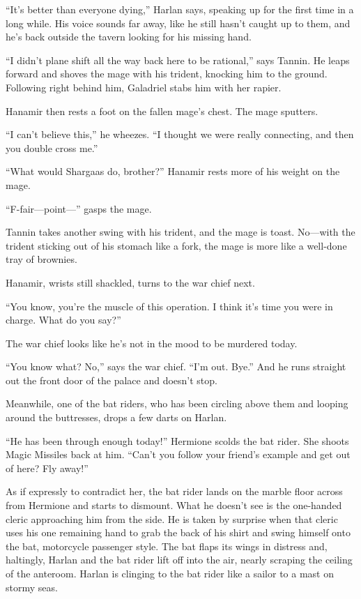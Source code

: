 \documentclass[smalldemyvopaper,11pt,twoside,onecolumn,openright,extrafontsizes]{memoir}
\newlength\drop
\begin{document}
``It's better than everyone dying,'' Harlan says, speaking up for the
first time in a long while. His voice sounds far away, like he still
hasn't caught up to them, and he's back outside the tavern looking for
his missing hand.

``I didn't plane shift all the way back here to be rational,'' says
Tannin. He leaps forward and shoves the mage with his trident, knocking
him to the ground. Following right behind him, Galadriel stabs him with
her rapier.

Hanamir then rests a foot on the fallen mage's chest. The mage sputters.

``I can't believe this,'' he wheezes. ``I thought we were really
connecting, and then you double cross me.''

``What would Shargaas do, brother?'' Hanamir rests more of his weight on
the mage.

``F-fair---point---'' gasps the mage.

Tannin takes another swing with his trident, and the mage is toast.
No---with the trident sticking out of his stomach like a fork, the mage
is more like a well-done tray of brownies.

Hanamir, wrists still shackled, turns to the war chief next.

``You know, you're the muscle of this operation. I think it's time you
were in charge. What do you say?''

The war chief looks like he's not in the mood to be murdered today.

``You know what? No,'' says the war chief. ``I'm out. Bye.'' And he runs
straight out the front door of the palace and doesn't stop.

Meanwhile, one of the bat riders, who has been circling above them and
looping around the buttresses, drops a few darts on Harlan.

``He has been through enough today!'' Hermione scolds the bat rider. She
shoots Magic Missiles back at him. ``Can't you follow your friend's
example and get out of here? Fly away!''

As if expressly to contradict her, the bat rider lands on the marble
floor across from Hermione and starts to dismount. What he doesn't see
is the one-handed cleric approaching him from the side. He is taken by
surprise when that cleric uses his one remaining hand to grab the back
of his shirt and swing himself onto the bat, motorcycle passenger style.
The bat flaps its wings in distress and, haltingly, Harlan and the bat
rider lift off into the air, nearly scraping the ceiling of the
anteroom. Harlan is clinging to the bat rider like a sailor to a mast on
stormy seas.
\end{document}
